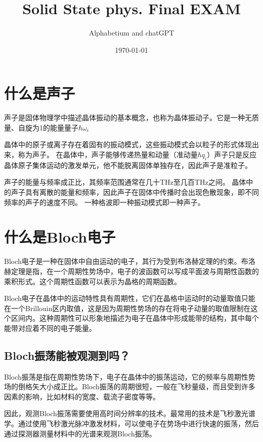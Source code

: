 \documentclass[12pt, a4paper, oneside]{ctexart}
\title{Solid State phys. Final EXAM}
\date{\today}
\author{Alphabetium and chatGPT}
\begin{document}
\begin{spacing}{2.0}
\tableofcontents
\maketitle
\thispagestyle{fancy}
\lhead{}
\lfoot{}
\rfoot{}

\section{什么是声子}
声子是固体物理学中描述晶体振动的基本概念，也称为晶体振动子。它是一种无质量、自旋为1的能量量子$\hbar \omega_i$

晶体中的原子或离子存在着固有的振动模式，这些振动模式会以粒子的形式体现出来，称为声子。
在晶体中，声子能够传递热量和动量（准动量$\hbar q_i$）声子只是反应晶体原子集体运动的激发单元，他不能脱离固体单独存在，因此声子是准粒子。

声子的能量与频率成正比，其频率范围通常在几十THz至几百THz之间。
晶体中的声子具有离散的能量和频率，因此声子在固体中传播时会出现色散现象，即不同频率的声子的速度不同。
一种格波即一种振动模式即一种声子。



\section{什么是Bloch电子}
Bloch电子是一种在固体中自由运动的电子，其行为受到布洛赫定理的约束。布洛赫定理是指，在一个周期性势场中，电子的波函数可以写成平面波与周期性函数的乘积形式。这个周期性函数可以表示为晶格的周期函数。

Bloch电子在晶体中的运动特性具有周期性，它们在晶格中运动时的动量取值只能在一个Brillouin区内取值，这是因为周期性势场的存在将电子动量的取值限制在这个区间内。这种周期性可以形象地描述为电子在晶体中形成能带的结构，其中每个能带对应着不同的电子能量。
\subsection{Bloch振荡能被观测到吗？}
Bloch振荡是指在周期性势场下，电子在晶体中的振荡运动，它的频率与周期性势场的倒格矢大小成正比。Bloch振荡的周期很短，一般在飞秒量级，而且受到许多因素的影响，比如材料的宽度、载流子密度等等。

因此，观测Bloch振荡需要使用高时间分辨率的技术。最常用的技术是飞秒激光谱学。通过使用飞秒激光脉冲激发材料，可以使电子在势场中进行快速的振荡，然后通过探测器测量材料中的光谱来观测Bloch振荡。


\end{spacing}
\end{document}
